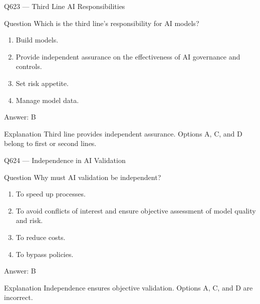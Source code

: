 \documentclass[aspectratio=169,8pt]{beamer}
\begin{document}
	\begin{frame}{Q623 --- Third Line AI Responsibilities}
		\begin{block}{Question}
			Which is the third line's responsibility for AI models?
			\begin{enumerate}
				\item Build models.
				\item Provide independent assurance on the effectiveness of AI governance and controls.
				\item Set risk appetite.
				\item Manage model data.
			\end{enumerate}
		\end{block}
		\begin{exampleblock}{Answer: B}\end{exampleblock}
		\begin{block}{Explanation}
			Third line provides independent assurance. Options A, C, and D belong to first or second lines.
		\end{block}
	\end{frame}
	
	\begin{frame}{Q624 --- Independence in AI Validation}
		\begin{block}{Question}
			Why must AI validation be independent?
			\begin{enumerate}
				\item To speed up processes.
				\item To avoid conflicts of interest and ensure objective assessment of model quality and risk.
				\item To reduce costs.
				\item To bypass policies.
			\end{enumerate}
		\end{block}
		\begin{exampleblock}{Answer: B}\end{exampleblock}
		\begin{block}{Explanation}
			Independence ensures objective validation. Options A, C, and D are incorrect.
		\end{block}
	\end{frame}
	
\end{document}
